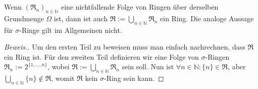 \begin{lemma}
    Wenn $(\mathfrak{R}_n)_{n\in\mathbb{N}}$ eine nichtfallende Folge von Ringen über derselben Grundmenge $\Omega$ ist, dann ist auch $\mathfrak{R}:=\bigcup_{n\in\mathbb{N}}\mathfrak{R}_n$ ein Ring. Die analoge Aussage für $\sigma$-Ringe gilt im Allgemeinen nicht.
\end{lemma}
\begin{proof}[Beweis.]
    Um den ersten Teil zu beweisen muss man einfach nachrechnen, dass $\mathfrak{R}$ ein Ring ist.\newline
    Für den zweiten Teil definieren wir eine Folge von $\sigma$-Ringen $\mathfrak{R}_n:=2^{\{1,\dots,n\}}$, wobei $\mathfrak{R}:=\bigcup_{n\in\mathbb{N}}\mathfrak{R}_n$ sein soll. Nun ist $\forall n\in\mathbb{N}:\{n\}\in\mathfrak{R}$, aber $\bigcup_{n\in\mathbb{N}}\{n\}\notin\mathfrak{R}$, womit $\mathfrak{R}$ kein $\sigma$-Ring sein kann.
\end{proof}
